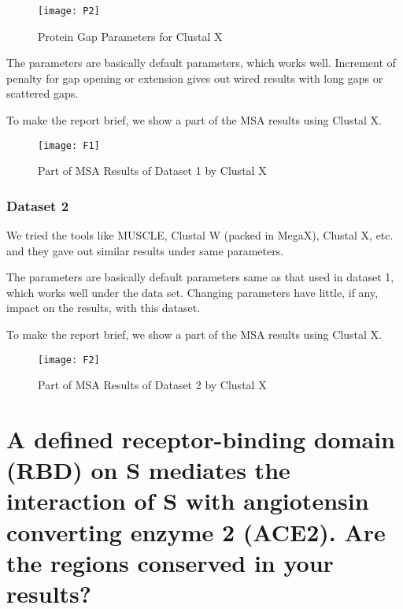 \begin{figure}[H]
    \centering
    \texttt{[image: P2]}
    \caption{Protein Gap Parameters for Clustal X}
    \label{P-02}
\end{figure}


The parameters are basically default parameters, which works well. Increment of penalty for gap opening or extension gives out wired results with long gaps or scattered gaps.

To make the report brief, we show a part of the MSA results using Clustal X.

\begin{figure}[H]
    \centering
    \texttt{[image: F1]}
    \caption{Part of MSA Results of Dataset 1 by Clustal X}
    \label{F-01}
\end{figure}

\subsubsection{Dataset 2}

We tried the tools like MUSCLE, Clustal W (packed in MegaX), Clustal X, etc. and they gave out similar results under same parameters. 

The parameters are basically default parameters same as that used in dataset 1, which works well under the data set. Changing parameters have little, if any, impact on the results, with this dataset.

To make the report brief, we show a part of the MSA results using Clustal X.

\begin{figure}[H]
    \centering
    \texttt{[image: F2]}
    \caption{Part of MSA Results of Dataset 2 by Clustal X}
    \label{F-02}
\end{figure}


















\section{A defined receptor-binding domain (RBD) on S mediates the interaction of S with angiotensin converting enzyme 2 (ACE2). Are the regions conserved in your results?}

